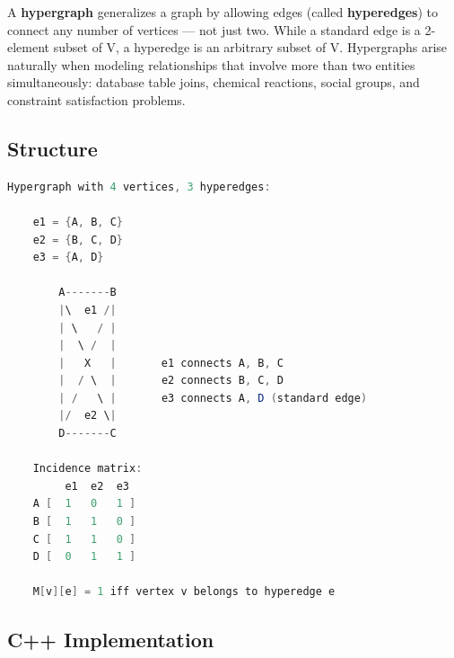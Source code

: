 A \textbf{hypergraph} generalizes a graph by allowing edges (called \textbf{hyperedges}) to connect any number of vertices — not just two. While a standard edge is a 2-element subset of V, a hyperedge is an arbitrary subset of V. Hypergraphs arise naturally when modeling relationships that involve more than two entities simultaneously: database table joins, chemical reactions, social groups, and constraint satisfaction problems.

\subsection{Structure}

\begin{lstlisting}[language=Java]
Hypergraph with 4 vertices, 3 hyperedges:

    e1 = {A, B, C}
    e2 = {B, C, D}
    e3 = {A, D}

        A-------B
        |\  e1 /|
        | \   / |
        |  \ /  |
        |   X   |       e1 connects A, B, C
        |  / \  |       e2 connects B, C, D
        | /   \ |       e3 connects A, D (standard edge)
        |/  e2 \|
        D-------C

    Incidence matrix:
         e1  e2  e3
    A [  1   0   1 ]
    B [  1   1   0 ]
    C [  1   1   0 ]
    D [  0   1   1 ]

    M[v][e] = 1 iff vertex v belongs to hyperedge e
\end{lstlisting}

\subsection{C++ Implementation}

